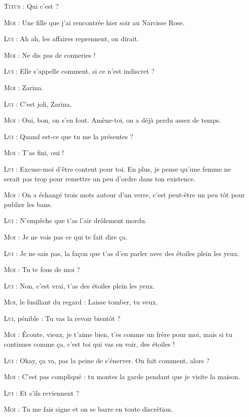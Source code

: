 \begin{dialogue}

\textsc{Titus} : Qui c’est ?

\textsc{Moi} : Une fille que j’ai rencontrée hier soir au Narcisse Rose.

\textsc{Lui} : Ah ah, les affaires reprennent, on dirait.

\textsc{Moi} : Ne dis pas de conneries !

\textsc{Lui} : Elle s’appelle comment, si ce n’est indiscret ?

\textsc{Moi} : Zarina.

\textsc{Lui} : C’est joli, Zarina.

\textsc{Moi} : Oui, bon, on s’en fout. Amène-toi, on a déjà perdu assez de temps.

\textsc{Lui} : Quand est-ce que tu me la présentes ?

\textsc{Moi} : T’as fini, oui !

\textsc{Lui} : Excuse-moi d’être content pour toi. En plus, je pense qu’une femme ne serait pas trop pour remettre un peu d’ordre dans ton existence.

\textsc{Moi} : On a échangé trois mots autour d’un verre, c’est peut-être un peu tôt pour publier les bans.

\textsc{Lui} : N’empêche que t’as l’air drôlement mordu.

\textsc{Moi} : Je ne vois pas ce qui te fait dire ça.

\textsc{Lui} : Je ne sais pas, la façon que t’as d’en parler avec des étoiles plein les yeux.

\textsc{Moi} : Tu te fous de moi ?

\textsc{Lui} : Non, c’est vrai, t’as des étoiles plein les yeux.

\textsc{Moi}, le fusillant du regard : Laisse tomber, tu veux.

\textsc{Lui}, pénible : Tu vas la revoir bientôt ?

\textsc{Moi} : Écoute, vieux, je t’aime bien, t’es comme un frère pour moi, mais si tu continues comme ça, c’est toi qui vas en voir, des étoiles !

\textsc{Lui} : Okay, ça va, pas la peine de s’énerver. On fait comment, alors ?

\textsc{Moi} : C’est pas compliqué : tu montes la garde pendant que je visite la maison.

\textsc{Lui} : Et s’ils reviennent ?

\textsc{Moi} : Tu me fais signe et on se barre en toute discrétion.


\end{dialogue}
